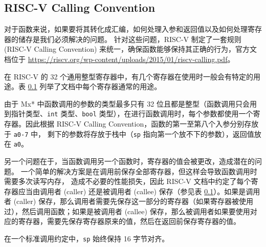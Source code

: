 \subsection{RISC-V Calling Convention}\label{RV-calling-convention}

对于函数来说，如果要将其转化成汇编，如何处理入参和返回值以及如何处理寄存器的储存是我们必须解决的问题。
针对这些问题，RISC-V 制定了一套规则 (RISC-V Calling Convention)
来统一，确保函数能够保持其正确的行为，官方文档位于
\url{https://riscv.org/wp-content/uploads/2015/01/riscv-calling.pdf}。

在 RISC-V 的 32 个通用整型寄存器中，有几个寄存器在使用时一般会有特定的用途。表
\ref{RV-calling-convention} 列举了文档中每个寄存器通常的用途。

由于 Mx* 中函数调用的参数的类型最多只有 32 位且都是整型（函数调用只会用到指针类型、\texttt{int}
类型、\texttt{bool} 类型），在进行函数调用时，每个参数都使用一个寄存器。因此根据 RISC-V
Calling Convention，函数的第一至第八个入参分别存放于 \texttt{a0-7} 中，
剩下的参数将存放于栈中（\texttt{sp} 指向第一个放不下的参数），返回值放在
\texttt{a0}。

另一个问题在于，当函数调用另一个函数时，寄存器的值会被更改，造成潜在的问题。
一个简单的解决方案是在调用前保存全部寄存器，但这样会导致函数调用时需要多次读写内存，
造成不必要的性能损失，因此 RISC-V 文档中约定了每个寄存器应当由调用者 (caller) 还是被调用者
(callee) 保存（参见表 \ref{RV-calling-convention}）。如果是调用者 (caller)
保存，那么调用者需要先保存这一部分的寄存器（如果寄存器被使用过），然后调用函数；如果是被调用者
(callee) 保存，那么被调用者如果要使用对应的寄存器，需要先保存寄存器原来的值，然后在返回前保存寄存器的值。

在一个标准调用约定中，\texttt{sp} 始终保持 16 字节对齐。

